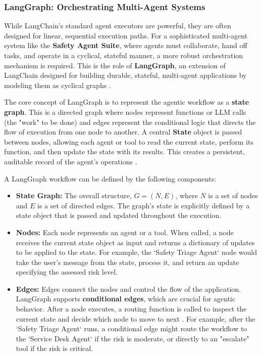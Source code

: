 \subsubsection{LangGraph: Orchestrating Multi-Agent Systems}

While LangChain's standard agent executors are powerful, they are often designed for linear, sequential execution paths. For a sophisticated multi-agent system like the \textbf{Safety Agent Suite}, where agents must collaborate, hand off tasks, and operate in a cyclical, stateful manner, a more robust orchestration mechanism is required. This is the role of \textbf{LangGraph}, an extension of LangChain designed for building durable, stateful, multi-agent applications by modeling them as cyclical graphs \cite{yang2025aiagentprotocols,rauch2025modularagents}.

The core concept of LangGraph is to represent the agentic workflow as a \textbf{state graph}. This is a directed graph where nodes represent functions or LLM calls (the "work" to be done) and edges represent the conditional logic that directs the flow of execution from one node to another. A central \textbf{State} object is passed between nodes, allowing each agent or tool to read the current state, perform its function, and then update the state with its results. This creates a persistent, auditable record of the agent's operations \cite{mathew2025largelanguagemodelagents,pospech2025metagraph}.

A LangGraph workflow can be defined by the following components:
\begin{itemize}
    \item \textbf{State Graph:} The overall structure, $G = (N, E)$, where $N$ is a set of nodes and $E$ is a set of directed edges. The graph's state is explicitly defined by a state object that is passed and updated throughout the execution.
    \item \textbf{Nodes:} Each node represents an agent or a tool. When called, a node receives the current state object as input and returns a dictionary of updates to be applied to the state. For example, the `Safety Triage Agent` node would take the user's message from the state, process it, and return an update specifying the assessed risk level.
    \item \textbf{Edges:} Edges connect the nodes and control the flow of the application. LangGraph supports \textbf{conditional edges}, which are crucial for agentic behavior. After a node executes, a routing function is called to inspect the current state and decide which node to move to next \cite{yu2025agentworkflow,pospech2025metagraph}. For example, after the `Safety Triage Agent` runs, a conditional edge might route the workflow to the `Service Desk Agent` if the risk is moderate, or directly to an "escalate" tool if the risk is critical.
\end{itemize}

